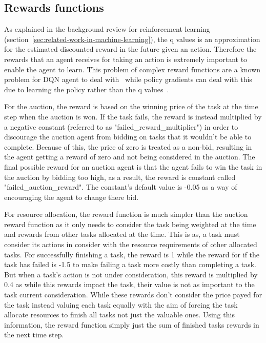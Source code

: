 \subsection{Rewards functions}\label{subsec:rewards-functions}
As explained in the background review for reinforcement learning (section~\ref{sec:related-work-in-machine-learning}),
the q values is an approximation for the estimated discounted reward in the future given an action. Therefore the
rewards that an agent receives for taking an action is extremely important to enable the agent to learn. This problem
of complex reward functions are a known problem for DQN agent to deal with~\citep{atari} while policy gradients can
deal with this due to learning the policy rather than the q values~\citep{Sutton1998}.

For the auction, the reward is based on the winning price of the task at the time step when the auction is won. If the
task fails, the reward is instead multiplied by a negative constant (referred to as "failed_reward_multiplier") in
order to discourage the auction agent from bidding on tasks that it wouldn't be able to complete. Because of this,
the price of zero is treated as a non-bid, resulting in the agent getting a reward of zero and not being considered in
the auction. The final possible reward for an auction agent is that the agent fails to win the task in the auction by
bidding too high, as a result, the reward is constant called "failed_auction_reward". The constant's default value is
-0.05 as a way of encouraging the agent to change there bid.

For resource allocation, the reward function is much simpler than the auction reward function as it only needs to
consider the task being weighted at the time and rewards from other tasks allocated at the time. This is as,
a task must consider its actions in consider with the resource requirements of other allocated tasks. For successfully
finishing a task, the reward is 1 while the reward for if the task has failed is -1.5 to make failing a task more
costly than completing a task. But when a task's action is not under consideration, this reward is multiplied by
0.4 as while this rewards impact the task, their value is not as important to the task current consideration.
While these rewards don't consider the price payed for the task instead valuing each task equally with the aim of
forcing the task allocate resources to finish all tasks not just the valuable ones. Using this information, the reward
function simply just the sum of finished tasks rewards in the next time step.

